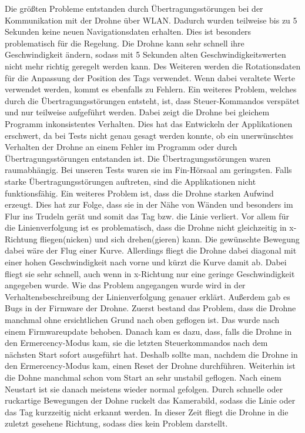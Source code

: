 Die größten Probleme entstanden durch Übertragungsstörungen bei der Kommunikation mit der Drohne über WLAN. Dadurch wurden teilweise bis zu 5 Sekunden keine neuen Navigationsdaten erhalten. Dies ist besonders problematisch für die Regelung. Die Drohne kann sehr schnell ihre Geschwindigkeit ändern, sodass mit 5 Sekunden alten Geschwindigkeitswerten nicht mehr richtig geregelt werden kann. Des Weiteren werden die Rotationsdaten für die Anpassung der Position des Tags verwendet. Wenn dabei veraltete Werte verwendet werden, kommt es ebenfalls zu Fehlern. Ein weiteres Problem, welches durch die Übertragungsstörungen entsteht, ist, dass Steuer-\/Kommandos verspätet und nur teilweise aufgeführt werden. Dabei zeigt die Drohne bei gleichem Programm inkonsistentes Verhalten. Dies hat das Entwickeln der Applikationen erschwert, da bei Tests nicht genau gesagt werden konnte, ob ein unerwünschtes Verhalten der Drohne an einem Fehler im Programm oder durch Übertragungsstörungen entstanden ist. Die Übertragungsstörungen waren raumabhängig. Bei unseren Tests waren sie im Fin-\/Hörsaal am geringsten. Falls starke Übertragungsstörungen auftreten, sind die Applikationen nicht funktionsfähig. Ein weiteres Problem ist, dass die Drohne starken Aufwind erzeugt. Dies hat zur Folge, dass sie in der Nähe von Wänden und besonders im Flur ins Trudeln gerät und somit das Tag bzw. die Linie verliert. Vor allem für die Linienverfolgung ist es problematisch, dass die Drohne nicht gleichzeitig in x-\/Richtung fliegen(nicken) und sich drehen(gieren) kann. Die gewünschte Bewegung dabei wäre der Flug einer Kurve. Allerdings fliegt die Drohne dabei diagonal mit einer hohen Geschwindigkeit nach vorne und kürzt die Kurve damit ab. Dabei fliegt sie sehr schnell, auch wenn in x-\/Richtung nur eine geringe Geschwindigkeit angegeben wurde. Wie das Problem angegangen wurde wird in der Verhaltensbeschreibung der Linienverfolgung genauer erklärt. Außerdem gab es Bugs in der Firmware der Drohne. Zuerst bestand das Problem, dass die Drohne manchmal ohne ersichtlichen Grund nach oben geflogen ist. Das wurde nach einem Firmwareupdate behoben. Danach kam es dazu, dass, falls die Drohne in den Ermercency-\/Modus kam, sie die letzten Steuerkommandos nach dem nächsten Start sofort ausgeführt hat. Deshalb sollte man, nachdem die Drohne in den Ermercency-\/Modus kam, einen Reset der Drohne durchführen. Weiterhin ist die Dohne manchmal schon vom Start an sehr unstabil geflogen. Nach einem Neustart ist sie danach meistens wieder normal gefolgen. Durch schnelle oder ruckartige Bewegungen der Dohne ruckelt das Kamerabild, sodass die Linie oder das Tag kurzzeitig nicht erkannt werden. In dieser Zeit fliegt die Drohne in die zuletzt gesehene Richtung, sodass dies kein Problem darstellt.

